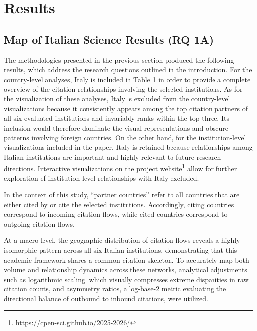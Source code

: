 \documentclass[year=2026]{cup-journal}
\begin{document}
\section{Results}

\subsection{Map of Italian Science Results (RQ 1A)}
The methodologies presented in the previous section produced the following results, which address the research questions outlined in the introduction. For the country-level analyses, Italy is included in Table 1 in order to provide a complete overview of the citation relationships involving the selected institutions. As for the visualization of these analyses, Italy is excluded from the country-level visualizations because it consistently appears among the top citation partners of all six evaluated institutions and invariably ranks within the top three. Its inclusion would therefore dominate the visual representations and obscure patterns involving foreign countries. On the other hand, for the institution-level visualizations included in the paper, Italy is retained because relationships among Italian institutions are important and highly relevant to future research directions. Interactive visualizations on the \href{https://open-sci.github.io/2025-2026/}{project website}\footnote{\url{https://open-sci.github.io/2025-2026/}} allow for further exploration of institution-level relationships with Italy excluded.

In the context of this study, “partner countries” refer to all countries that are either cited by or cite the selected institutions. Accordingly, citing countries correspond to incoming citation flows, while cited countries correspond to outgoing citation flows.

At a macro level, the geographic distribution of citation flows reveals a highly isomorphic pattern across all six Italian institutions, demonstrating that this academic framework shares a common citation skeleton. To accurately map both volume and relationship dynamics across these networks, analytical adjustments such as logarithmic scaling, which visually compresses extreme disparities in raw citation counts, and asymmetry ratios, a log-base-2 metric evaluating the directional balance of outbound to inbound citations, were utilized.
\end{document}

